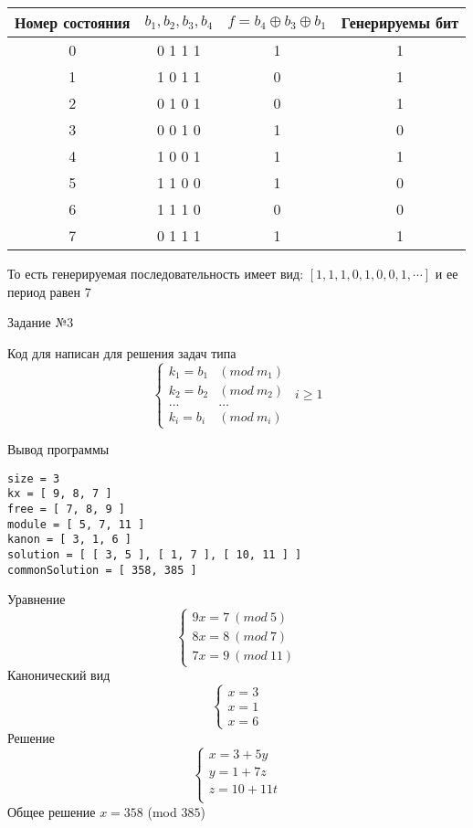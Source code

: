 \begin{table}[h]
  \begin{center}
    \begin{tabular}{|c|c|c|c|}
      \hline
      Номер состояния & $b_1, b_2, b_3, b_4$ & $f =  b_4 \oplus b_3 \oplus b_1$
      & Генерируемы бит\\
      \hline
       0 & 0 1 1 1 & 1 & 1 \\
       \hline
       1 & 1 0 1 1 & 0 & 1 \\
       \hline
       2 & 0 1 0 1 & 0 & 1 \\
       \hline
       3 & 0 0 1 0 & 1 & 0\\
       \hline
       4 & 1 0 0 1 & 1 & 1\\
       \hline
       5 & 1 1 0 0 & 1 & 0\\
       \hline
       6 & 1 1 1 0 & 0 & 0\\
       \hline
       7 & 0 1 1 1 & 1 & 1\\
       \hline
    \end{tabular}
  \end{center}
\end{table}
То есть генерируемая последовательность имеет вид: $[1, 1, 1, 0, 1, 0, 0, 1,
\cdots]$ и ее период равен 7\\

\begin{title}
  Задание №3
\end{title}

Код для написан для решения задач типа
$$
\left\{
\begin{array}{lc}
  k_1 = b_1 & (mod ~ m_1) \\
  k_2 = b_2 & (mod ~ m_2) \\
  \ldots & \ldots \\
  k_i = b_i & (mod ~ m_i)
\end{array}
\right. ~~ i \ge 1
$$



Вывод программы
\begin{lstlisting}
size = 3
kx = [ 9, 8, 7 ]
free = [ 7, 8, 9 ]
module = [ 5, 7, 11 ]
kanon = [ 3, 1, 6 ]
solution = [ [ 3, 5 ], [ 1, 7 ], [ 10, 11 ] ]
commonSolution = [ 358, 385 ]
\end{lstlisting}

Уравнение
$$
\left\{
\begin{array}{l}
  9x = 7 ~ (mod ~ 5)\\
  8x = 8 ~ (mod ~ 7)\\
  7x = 9 ~ (mod ~ 11)
\end{array}
\right.
$$
Канонический вид
$$
\left\{
\begin{array}{l}
  x = 3 \\
  x = 1 \\
  x = 6
\end{array}
\right.
$$
Решение
$$
\left\{
\begin{array}{l}
  x = 3 + 5y \\
  y = 1 + 7z \\
  z = 10 + 11t \\
\end{array}
\right.
$$
Общее решение $x = 358$ (mod $385$) \\

